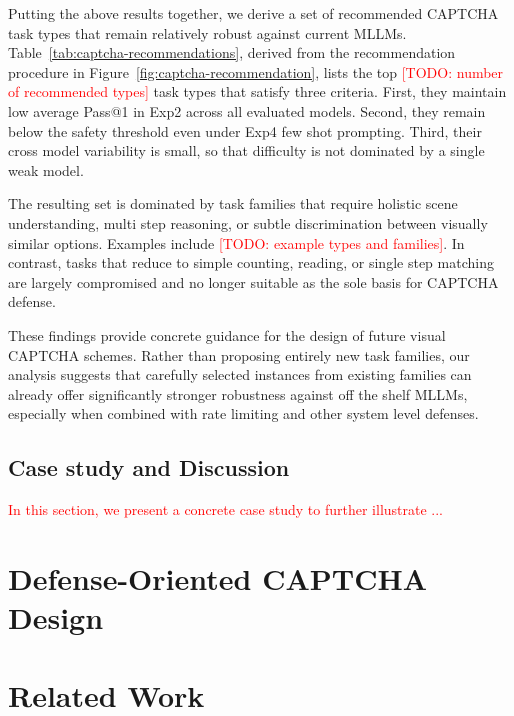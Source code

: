 \documentclass[sigconf, review]{acmart}
\begin{document}
Putting the above results together, we derive a set of recommended CAPTCHA task types that remain relatively robust against current MLLMs. Table~\ref{tab:captcha-recommendations}, derived from the recommendation procedure in Figure~\ref{fig:captcha-recommendation}, lists the top \textcolor{red}{[TODO: number of recommended types]} task types that satisfy three criteria. First, they maintain low average Pass@1 in Exp2 across all evaluated models. Second, they remain below the safety threshold even under Exp4 few shot prompting. Third, their cross model variability is small, so that difficulty is not dominated by a single weak model.

The resulting set is dominated by task families that require holistic scene understanding, multi step reasoning, or subtle discrimination between visually similar options. Examples include \textcolor{red}{[TODO: example types and families]}. In contrast, tasks that reduce to simple counting, reading, or single step matching are largely compromised and no longer suitable as the sole basis for CAPTCHA defense.

These findings provide concrete guidance for the design of future visual CAPTCHA schemes. Rather than proposing entirely new task families, our analysis suggests that carefully selected instances from existing families can already offer significantly stronger robustness against off the shelf MLLMs, especially when combined with rate limiting and other system level defenses.



\subsection{Case study and Discussion}
\textcolor{red}{In this section, we present a concrete case study to further illustrate ...}







\section{Defense-Oriented CAPTCHA Design}

\section{Related Work}
\label{sec:related-work}
\end{document}

